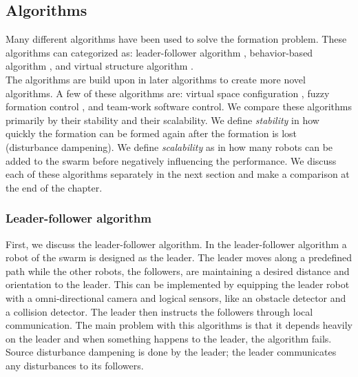 \subsection{Algorithms}
Many different algorithms have been used to solve the formation problem. \cite{chen2005formation,consolini2008leader}
These algorithms can categorized as: leader-follower algorithm \cite{consolini2008leader,das2002vision}, 
behavior-based algorithm \cite{balch1998behavior,lawton2003decentralized}, 
and virtual structure algorithm \cite{ren2004decentralized,do2007nonlinear}. \\
The algorithms are build upon in later algorithms to create more novel algorithms. A few of these algorithms are: 
virtual space configuration \cite{wee2013formation}, 
fuzzy formation control \cite{ranjbar2012novel},
and team-work software control. \cite{kaminka2013use} 
We compare these algorithms primarily by their stability and their scalability. 
We define \emph{stability} in how quickly the formation can be formed again after the formation is lost (disturbance dampening). 
We define \emph{scalability} as in how many robots can be added to the swarm before negatively influencing the performance.
We discuss each of these algorithms separately in the next section and make a comparison at the end of the chapter.

\subsubsection{Leader-follower algorithm}
First, we discuss the leader-follower algorithm. 
In the leader-follower algorithm a robot of the swarm is designed as the leader.
The leader moves along a predefined path while the other robots, the followers, are maintaining a desired distance and orientation to the leader. \cite{consolini2008leader}
This can be implemented by equipping the leader robot with a omni-directional camera and logical sensors, like an obstacle detector and a collision detector.
The leader then instructs the followers through local communication. \cite{das2002vision}
The main problem with this algorithms is that it depends heavily on the leader and when something happens to the leader, the algorithm fails. 
Source disturbance dampening is done by the leader; the leader communicates any disturbances to its followers.

